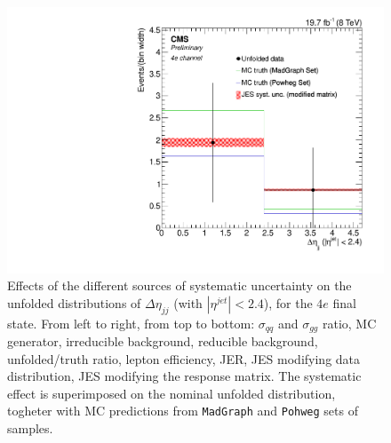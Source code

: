 \begin{figure}[hbtp]
\begin{center}
   \includegraphics[width=0.8\cmsFigWidth]{Figures/Unfolding/Systematics/ZZTo4e_CentralDeta_JES_ModMat_Mad_fr}
   \caption{Effects of the different sources of systematic uncertainty on the unfolded distributions of $\Delta\eta_{jj}$ (with $|\eta^{jet}|<2.4$), for the $4e$ final state. From left to right, from top to bottom: $\sigma_{qq}$ and $\sigma_{gg}$ ratio, MC generator, irreducible background, reducible background, unfolded/truth ratio, lepton efficiency, JER, JES modifying data distribution, JES modifying the response matrix. The systematic effect is superimposed on the nominal unfolded distribution, togheter with MC predictions from \texttt{MadGraph} and \texttt{Pohweg} sets of samples.}
   \label{fig:CentralDeta_syst_4e}
 \end{center}
\end{figure}

